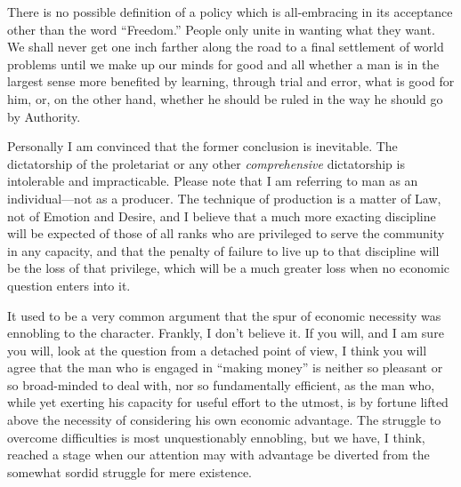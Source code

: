 \documentclass{book}
\begin{document}
There is no possible definition of a policy which is all-embracing in its acceptance other than the word “Freedom.” People only unite in wanting what they want. We shall never get one inch farther along the road to a final settlement of world problems until we make up our minds for good and all whether a man is in the largest sense more benefited by learning, through trial and error, what is good for him, or, on the other hand, whether he should be ruled in the way he should go by Authority.

Personally I am convinced that the former conclusion is inevitable. The dictatorship of the proletariat or any other \emph{comprehensive} dictatorship is intolerable and impracticable. Please note that I am referring to man as an individual—not as a producer. The technique of production is a matter of Law, not of Emotion and Desire, and I believe that a much more exacting discipline will be expected of those of all ranks who are privileged to serve the community in any capacity, and that the penalty of failure to live up to that discipline will be the loss of that privilege, which will be a much greater loss when no economic question enters into it.

It used to be a very common argument that the spur of economic necessity was ennobling to the character. Frankly, I don’t believe it. If you will, and I am sure you will, look at the question from a detached point of view, I think you will agree that the man who is engaged in “making money” is neither so pleasant or so broad-minded to deal with, nor so fundamentally efficient, as the man who, while yet exerting his capacity for useful effort to the utmost, is by fortune lifted above the necessity of considering his own economic advantage. The struggle to overcome difficulties is most unquestionably ennobling, but we have, I think, reached a stage when our attention may with advantage be diverted from the somewhat sordid struggle for mere existence.
\end{document}
